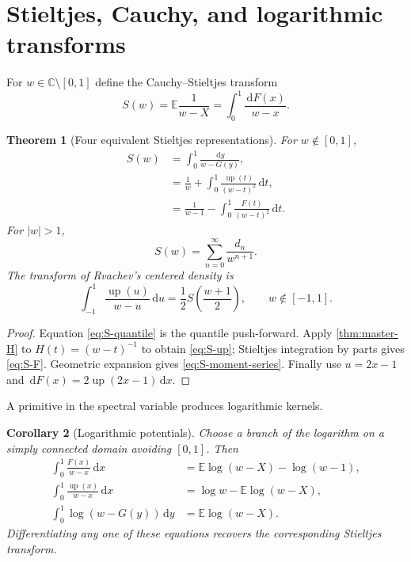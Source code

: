 \documentclass[11pt,oneside]{article}
\newtheorem{theorem}{Theorem}[section]
\newtheorem{corollary}[theorem]{Corollary}
\theoremstyle{definition}
\theoremstyle{remark}
\newcommand{\C}{\mathbb C}
\newcommand{\E}{\mathbb E}
\newcommand{\dd}{\,\mathrm d}
\newcommand{\upf}{\operatorname{up}}
\begin{document}
\section{Stieltjes, Cauchy, and logarithmic transforms}\label{sec:stieltjes}

For $w\in\C\setminus[0,1]$ define the Cauchy--Stieltjes transform
\begin{equation}\label{eq:S-def}
 S(w)=\E\frac1{w-X}
 =\int_0^1\frac{\dd F(x)}{w-x}.
\end{equation}

\begin{theorem}[Four equivalent Stieltjes representations]\label{thm:stieltjes-representations}
For $w\notin[0,1]$,
\begin{align}
 S(w)
 &=\int_0^1\frac{\dd y}{w-G(y)},\label{eq:S-quantile}\\
 &=\frac1w+\int_0^1\frac{\upf(t)}{(w-t)^2}\dd t,\label{eq:S-up}\\
 &=\frac1{w-1}-\int_0^1\frac{F(t)}{(w-t)^2}\dd t.\label{eq:S-F}
\end{align}
For $|w|>1$,
\begin{equation}\label{eq:S-moment-series}
 S(w)=\sum_{n=0}^{\infty}\frac{d_n}{w^{n+1}}.
\end{equation}
The transform of Rvachev's centered density is
\begin{equation}\label{eq:Cauchy-up}
 \int_{-1}^{1}\frac{\upf(u)}{w-u}\dd u
 =\frac12S\!\left(\frac{w+1}{2}\right),
 \qquad w\notin[-1,1].
\end{equation}
\end{theorem}

\begin{proof}
Equation \eqref{eq:S-quantile} is the quantile push-forward.  Apply \cref{thm:master-H} to $H(t)=(w-t)^{-1}$ to obtain \eqref{eq:S-up}; Stieltjes integration by parts gives \eqref{eq:S-F}.  Geometric expansion gives \eqref{eq:S-moment-series}.  Finally use $u=2x-1$ and $\dd F(x)=2\upf(2x-1)\dd x$.
\end{proof}

A primitive in the spectral variable produces logarithmic kernels.

\begin{corollary}[Logarithmic potentials]\label{cor:logarithmic-potentials}
Choose a branch of the logarithm on a simply connected domain avoiding $[0,1]$.  Then
\begin{align}
 \int_0^1\frac{F(x)}{w-x}\dd x
 &=\E\log(w-X)-\log(w-1),\label{eq:log-potential-F}\\
 \int_0^1\frac{\upf(x)}{w-x}\dd x
 &=\log w-\E\log(w-X),\label{eq:log-potential-up}\\
 \int_0^1\log(w-G(y))\dd y
 &=\E\log(w-X).\label{eq:log-potential-G}
\end{align}
Differentiating any one of these equations recovers the corresponding Stieltjes transform.
\end{corollary}
\end{document}
